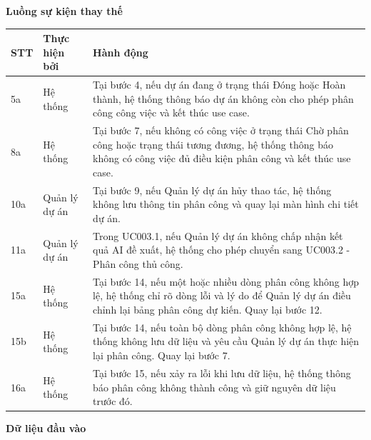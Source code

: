 \documentclass[../DoAn.tex]{subfiles}
\begin{document}
\textbf{Luồng sự kiện thay thế}

{\ucTableText
\begin{longtable}{|>{\centering\arraybackslash}p{}|p{}|p{}|}
\hline
\rowcolor{ucHeaderBg}\textbf{STT} & \textbf{Thực hiện bởi} & \textbf{Hành động} \\ \hline
5a & Hệ thống & Tại bước 4, nếu dự án đang ở trạng thái Đóng hoặc Hoàn thành, hệ thống thông báo dự án không còn cho phép phân công công việc và kết thúc use case. \\ \hline
8a & Hệ thống & Tại bước 7, nếu không có công việc ở trạng thái Chờ phân công hoặc trạng thái tương đương, hệ thống thông báo không có công việc đủ điều kiện phân công và kết thúc use case. \\ \hline
10a & Quản lý dự án & Tại bước 9, nếu Quản lý dự án hủy thao tác, hệ thống không lưu thông tin phân công và quay lại màn hình chi tiết dự án. \\ \hline
11a & Quản lý dự án & Trong UC003.1, nếu Quản lý dự án không chấp nhận kết quả AI đề xuất, hệ thống cho phép chuyển sang UC003.2 - Phân công thủ công. \\ \hline
15a & Hệ thống & Tại bước 14, nếu một hoặc nhiều dòng phân công không hợp lệ, hệ thống chỉ rõ dòng lỗi và lý do để Quản lý dự án điều chỉnh lại bảng phân công dự kiến. Quay lại bước 12. \\ \hline
15b & Hệ thống & Tại bước 14, nếu toàn bộ dòng phân công không hợp lệ, hệ thống không lưu dữ liệu và yêu cầu Quản lý dự án thực hiện lại phân công. Quay lại bước 7. \\ \hline
16a & Hệ thống & Tại bước 15, nếu xảy ra lỗi khi lưu dữ liệu, hệ thống thông báo phân công không thành công và giữ nguyên dữ liệu trước đó. \\ \hline
\end{longtable}
}

\textbf{Dữ liệu đầu vào}
\end{document}

